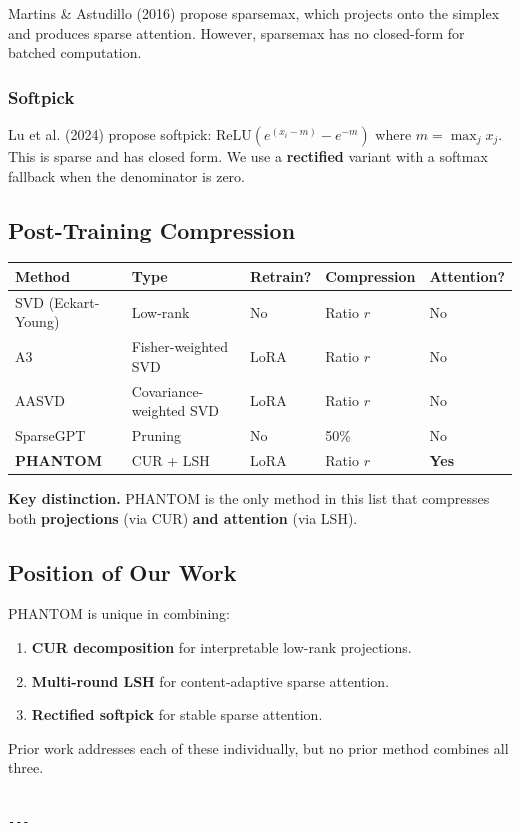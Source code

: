 Martins \& Astudillo (2016) propose sparsemax, which projects onto the simplex 
and produces sparse attention. However, sparsemax has no closed-form for 
batched computation.

\subsubsection{Softpick}

Lu et al. (2024) propose softpick: $\text{ReLU}(e^{(x_i - m)} - e^{-m})$ 
where $m = \max_j x_j$. This is sparse and has closed form. We use a 
\textbf{rectified} variant with a softmax fallback when the denominator is zero.

\subsection{Post-Training Compression}

\begin{table}[H]
\centering
\small
\begin{tabular}{lllll}
\toprule
\textbf{Method} & \textbf{Type} & \textbf{Retrain?} & \textbf{Compression} & \textbf{Attention?} \\
\midrule
SVD (Eckart-Young) & Low-rank & No & Ratio $r$ & No \\
A3 & Fisher-weighted SVD & LoRA & Ratio $r$ & No \\
AASVD & Covariance-weighted SVD & LoRA & Ratio $r$ & No \\
SparseGPT & Pruning & No & 50\% & No \\
\textbf{PHANTOM} & CUR + LSH & LoRA & Ratio $r$ & \textbf{Yes} \\
\bottomrule
\end{tabular}
\end{table}

\textbf{Key distinction.} PHANTOM is the only method in this list that compresses 
both \textbf{projections} (via CUR) \textbf{and attention} (via LSH).

\subsection{Position of Our Work}

PHANTOM is unique in combining:
\begin{enumerate}
\item \textbf{CUR decomposition} for interpretable low-rank projections.
\item \textbf{Multi-round LSH} for content-adaptive sparse attention.
\item \textbf{Rectified softpick} for stable sparse attention.

\end{enumerate}
Prior work addresses each of these individually, but no prior method combines 
all three.
\begin{lstlisting}

---
\end{lstlisting}